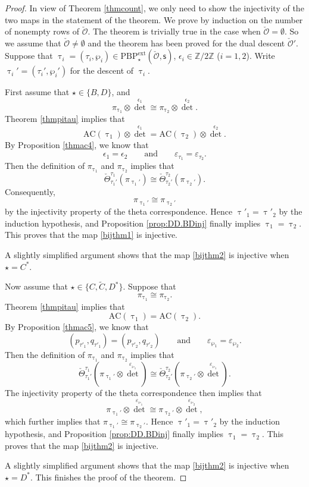 \documentclass[12pt,a4paper]{amsart}
\newcommand{\CO}{{\mathcal {O}}}
\newcommand{\Z}{\mathbb{Z}}
\numberwithin{equation}{section}
\theoremstyle{remark}
\def\PBPe{\mathrm{PBP}^{\mathrm{ext}}}
\begin{document}
\begin{proof}
In view of Theorem \ref{thmcount}, we only need to show the injectivity of  the two maps in the statement of the theorem. We prove by induction on the number of nonempty rows of $\check \CO$. The theorem is trivially true in the case when  $\check \CO=\emptyset$. So we assume that $\check \CO\neq \emptyset$  and the theorem has been proved for the dual descent $\check \CO'$.
Suppose that  $\uptau_i=(\tau_i, \wp_i)\in \PBPe_\star(\check \CO,\mathsf s)$, $\epsilon_i\in \Z/2\Z$ ($i=1,2$). Write  $\uptau_i'=(\tau_i', \wp_i')$ for the descent of $\uptau_i$.


First assume that $\star\in \{B,D\}$, and
\[
  \pi_{\uptau_1}\otimes {\det}^{\epsilon_1}\cong \pi_{\uptau_2}\otimes {\det}^{\epsilon_2}.
\]
Theorem \ref{thmpitau} implies that
\[
\mathrm{AC}(\uptau_1)\otimes {\det}^{\epsilon_1}=\mathrm{AC}(\uptau_2)\otimes {\det}^{\epsilon_2}.
\]
By Proposition \ref{thmac4}, we know that
\[
  \epsilon_1=\epsilon_2\qquad\textrm{and}\qquad \varepsilon_{\tau_1}=\varepsilon_{\tau_2}.
\]
Then the definition of $ \pi_{\uptau_1}$ and $ \pi_{\uptau_2}$ implies that
\[
 \check  \Theta_{\tau_1'}^{\tau_1}(\pi_{\uptau_1'})\cong \check \Theta_{\tau_2'}^{\tau_2}(\pi_{\uptau_2'}).
\]
 Consequently,
\[
\pi_{\uptau_1'}\cong \pi_{\uptau_2'}
\]
by the injectivity property of the theta correspondence. Hence $\uptau'_1=\uptau'_2$ by the induction hypothesis, and Proposition \ref{prop:DD.BDinj} finally implies $\uptau_1=\uptau_2$.
This proves that the map \eqref{bijthm1} is injective.

A slightly simplified argument shows that the map \eqref{bijthm2} is injective when $\star=C^*$.


Now assume that $\star\in \{C,\widetilde C, D^*\}$. Suppose that
\[
  \pi_{\uptau_1}\cong \pi_{\uptau_2}.
\]
Theorem \ref{thmpitau} implies that
\[
\mathrm{AC}(\uptau_1)=\mathrm{AC}(\uptau_2).
\]
By Proposition \ref{thmac5}, we know that
\[
 ( p_{\tau'_1}, q_{\tau'_1})=( p_{\tau'_2}, q_{\tau'_2})\qquad\textrm{and}\qquad \varepsilon_{\wp_1}=\varepsilon_{\wp_2}.
\]
Then the definition of $ \pi_{\uptau_1}$ and $ \pi_{\uptau_2}$ implies that
\[
  \check \Theta_{\tau_1'}^{\tau_1}(\pi_{\uptau_1'}\otimes {\det}^{\varepsilon_{\wp_1}})\cong \check \Theta_{\tau_2'}^{\tau_2}(\pi_{\uptau_2'}\otimes {\det}^{\varepsilon_{\wp_1}}).
\]
The injectivity property of the theta correspondence then implies that
\[
\pi_{\uptau_1'}\otimes {\det}^{\varepsilon_{\wp_1}}\cong \pi_{\uptau_2'}\otimes {\det}^{\varepsilon_{\wp_2}},
\]
which further implies that $\pi_{\uptau_1'}\cong \pi_{\uptau_2'}$.
Hence $\uptau'_1=\uptau'_2$ by the induction hypothesis, and Proposition \ref{prop:DD.BDinj} finally implies $\uptau_1=\uptau_2$. This proves that the map \eqref{bijthm2} is injective.

A slightly simplified argument shows that the map \eqref{bijthm2} is injective when $\star=D^*$. This finishes the proof of the theorem.
\end{proof}
\end{document}
